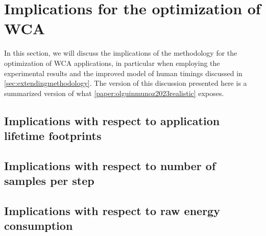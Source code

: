 \section{Implications for the optimization of \acs{WCA}}

In this section, we will discuss the implications of the methodology for the optimization of \gls{WCA} applications, in particular when employing the experimental results and the improved model of human timings discussed in \cref{sec:extendingmethodology}.
The version of this discussion presented here is a summarized version of what \cref{paper:olguinmunoz2023realistic} exposes.


\subsection{Implications with respect to application lifetime footprints}

\subsection{Implications with respect to number of samples per step}

\subsection{Implications with respect to raw energy consumption}
